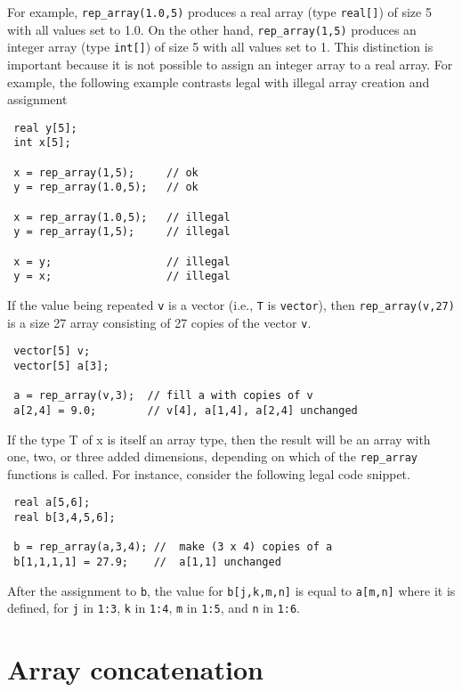 \documentclass[
  10pt,
]{book}
\begin{document}
For example, \texttt{rep\_array(1.0,5)} produces a real array (type \texttt{real{[}{]}})
of size 5 with all values set to 1.0. On the other hand,
\texttt{rep\_array(1,5)} produces an integer array (type \texttt{int{[}{]}}) of size 5
with all values set to 1. This distinction is important because it is
not possible to assign an integer array to a real array. For example,
the following example contrasts legal with illegal array creation and
assignment

\begin{verbatim}
 real y[5];
 int x[5];
 
 x = rep_array(1,5);     // ok
 y = rep_array(1.0,5);   // ok
 
 x = rep_array(1.0,5);   // illegal
 y = rep_array(1,5);     // illegal
 
 x = y;                  // illegal
 y = x;                  // illegal
\end{verbatim}

If the value being repeated \texttt{v} is a vector (i.e., \texttt{T} is \texttt{vector}),
then \texttt{rep\_array(v,27)} is a size 27 array consisting of 27 copies of
the vector \texttt{v}.

\begin{verbatim}
 vector[5] v;
 vector[5] a[3];
 
 a = rep_array(v,3);  // fill a with copies of v
 a[2,4] = 9.0;        // v[4], a[1,4], a[2,4] unchanged
\end{verbatim}

If the type T of x is itself an array type, then the result will be an
array with one, two, or three added dimensions, depending on which of
the \texttt{rep\_array} functions is called. For instance, consider the
following legal code snippet.

\begin{verbatim}
 real a[5,6];
 real b[3,4,5,6];
 
 b = rep_array(a,3,4); //  make (3 x 4) copies of a
 b[1,1,1,1] = 27.9;    //  a[1,1] unchanged
\end{verbatim}

After the assignment to \texttt{b}, the value for \texttt{b{[}j,k,m,n{]}} is equal to
\texttt{a{[}m,n{]}} where it is defined, for \texttt{j} in \texttt{1:3}, \texttt{k} in \texttt{1:4}, \texttt{m} in
\texttt{1:5}, and \texttt{n} in \texttt{1:6}.

\hypertarget{array-concatenation}{%
\section{Array concatenation}\label{array-concatenation}}
\end{document}
